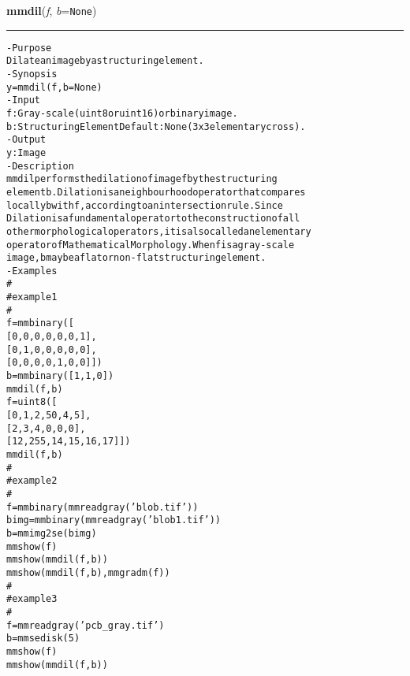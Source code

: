     \begin{boxedminipage}{\textwidth}

    \raggedright \textbf{mmdil}(\textit{f}, \textit{b}=\texttt{N\-o\-n\-e\-})

    \vspace{-1.5ex}

    \rule{\textwidth}{0.5\fboxrule}
\begin{alltt}
- Purpose
    Dilate an image by a structuring element.
- Synopsis
    y = mmdil(f, b=None)
- Input
    f: Gray-scale (uint8 or uint16) or binary image.
    b: Structuring Element Default: None (3x3 elementary cross).
- Output
    y: Image
- Description
    mmdil performs the dilation of image f by the structuring
    element b . Dilation is a neighbourhood operator that compares
    locally b with f , according to an intersection rule. Since
    Dilation is a fundamental operator to the construction of all
    other morphological operators, it is also called an elementary
    operator of Mathematical Morphology. When f is a gray-scale
    image, b may be a flat or non-flat structuring element.
- Examples
    \#
    \#   example 1
    \#
    f=mmbinary([
       [0, 0, 0, 0, 0, 0, 1],
       [0, 1, 0, 0, 0, 0, 0],
       [0, 0, 0, 0, 1, 0, 0]])
    b=mmbinary([1, 1, 0])
    mmdil(f,b)
    f=uint8([
       [ 0,   1,  2, 50,  4,  5],
       [ 2,   3,  4,  0,  0,  0],
       [12, 255, 14, 15, 16, 17]])
    mmdil(f,b)
    \#
    \#   example 2
    \#
    f=mmbinary(mmreadgray('blob.tif'))
    bimg=mmbinary(mmreadgray('blob1.tif'))
    b=mmimg2se(bimg)
    mmshow(f)
    mmshow(mmdil(f,b))
    mmshow(mmdil(f,b),mmgradm(f))
    \#
    \#   example 3
    \#
    f=mmreadgray('pcb\_gray.tif')
    b=mmsedisk(5)
    mmshow(f)
    mmshow(mmdil(f,b))\end{alltt}

    \vspace{1ex}

    \end{boxedminipage}

    \label{multireg:num_pymorph:mmdil_old}
    \vspace{0.5ex}

